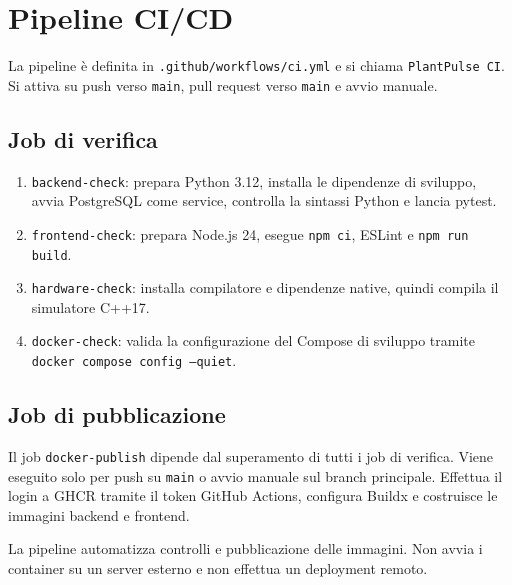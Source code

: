 \chapter{Pipeline CI/CD}

La pipeline è definita in \texttt{.github/workflows/ci.yml} e si chiama \texttt{PlantPulse CI}. Si attiva su push verso \texttt{main}, pull request verso \texttt{main} e avvio manuale.

\section{Job di verifica}
\begin{enumerate}
    \item \texttt{backend-check}: prepara Python 3.12, installa le dipendenze di sviluppo, avvia PostgreSQL come service, controlla la sintassi Python e lancia pytest.
    \item \texttt{frontend-check}: prepara Node.js 24, esegue \texttt{npm ci}, ESLint e \texttt{npm run build}.
    \item \texttt{hardware-check}: installa compilatore e dipendenze native, quindi compila il simulatore C++17.
    \item \texttt{docker-check}: valida la configurazione del Compose di sviluppo tramite \texttt{docker compose config --quiet}.
\end{enumerate}

\section{Job di pubblicazione}
Il job \texttt{docker-publish} dipende dal superamento di tutti i job di verifica. Viene eseguito solo per push su \texttt{main} o avvio manuale sul branch principale. Effettua il login a GHCR tramite il token GitHub Actions, configura Buildx e costruisce le immagini backend e frontend.

La pipeline automatizza controlli e pubblicazione delle immagini. Non avvia i container su un server esterno e non effettua un deployment remoto.
